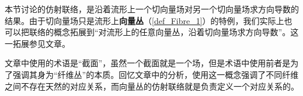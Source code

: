 本节讨论的仿射联络，是沿着流形上一个切向量场对另一个切向量场求方向导数的结果。由于切向量场只是流形上\textbf{向量丛}（\autoref{def_Fibre_1}）的特例，我们实际上也可以把联络的概念拓展到“对流形上的任意向量丛，沿着切向量场求方向导数”。这一拓展参见文章。

文章中使用的术语是“截面”，虽然一个截面就是一个场，但是术语中使用前者是为了强调其身为“纤维丛”的本质。回忆文章中的分析，使用这一概念强调了不同纤维之间不存在天然的对应关系，而向量丛的仿射联络就是负责定义一个对应关系的。



